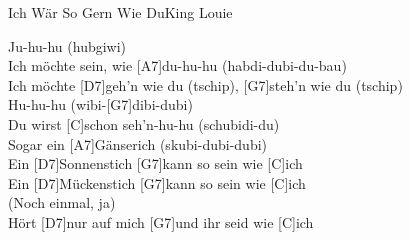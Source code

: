 \begin{song}{Ich Wär So Gern Wie Du}{King Louie}
    \begin{chorus}  
        [C]Ju-hu-hu (hubgiwi) \\
        Ich möchte sein, wie [A7]du-hu-hu (habdi-dubi-du-bau) \\
        Ich möchte [D7]geh'n wie du (tschip), [G7]steh'n wie du (tschip) \\
        [C]Hu-hu-hu (wibi-[G7]dibi-dubi) \\
        Du wirst [C]schon seh'n-hu-hu (schubidi-du) \\
        Sogar ein [A7]Gänserich (skubi-dubi-dubi) \\
        Ein [D7]Sonnenstich [G7]kann so sein wie [C]ich \\
        Ein [D7]Mückenstich [G7]kann so sein wie [C]ich \\
        (Noch einmal, ja) \\
        Hört [D7]nur auf mich [G7]und ihr seid wie [C]ich 
    \end{chorus}  

\end{song}
